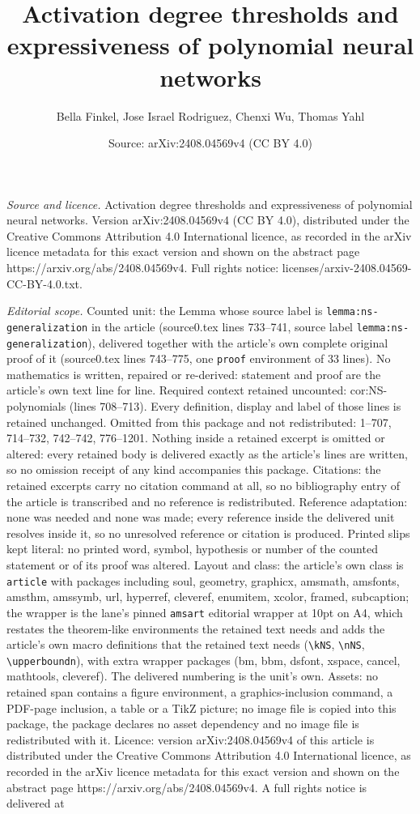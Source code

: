 \documentclass[10pt,a4paper]{amsart}
\title[Activation degree thresholds and expressiveness of polynomia]{Activation degree thresholds and expressiveness of polynomial neural networks}
\author{Bella Finkel, Jose Israel Rodriguez, Chenxi Wu, Thomas Yahl}
\date{Source: arXiv:2408.04569v4 (CC BY 4.0)}
\begin{document}
\maketitle

\noindent\emph{Source and licence.} Activation degree thresholds and expressiveness of polynomial neural networks. Version arXiv:2408.04569v4 (CC BY 4.0), distributed under the Creative Commons Attribution 4.0 International licence, as recorded in the arXiv licence metadata for this exact version and shown on the abstract page https://arxiv.org/abs/2408.04569v4. Full rights notice: licenses/arxiv-2408.04569-CC-BY-4.0.txt.\par\smallskip

\noindent\textit{Editorial scope.} Counted unit: the Lemma whose source label is \texttt{lemma:ns-generalization} in the article (source0.tex lines 733--741, source label \texttt{lemma:ns-generalization}), delivered together with the article's own complete original proof of it (source0.tex lines 743--775, one \texttt{proof} environment of 33 lines). No mathematics is written, repaired or re-derived: statement and proof are the article's own text line for line. Required context retained uncounted: cor:NS-polynomials (lines 708--713). Every definition, display and label of those lines is retained unchanged. Omitted from this package and not redistributed: 1--707, 714--732, 742--742, 776--1201. Nothing inside a retained excerpt is omitted or altered: every retained body is delivered exactly as the article's lines are written, so no omission receipt of any kind accompanies this package. Citations: the retained excerpts carry no citation command at all, so no bibliography entry of the article is transcribed and no reference is redistributed. Reference adaptation: none was needed and none was made; every reference inside the delivered unit resolves inside it, so no unresolved reference or citation is produced. Printed slips kept literal: no printed word, symbol, hypothesis or number of the counted statement or of its proof was altered. Layout and class: the article's own class is \texttt{article} with packages including soul, geometry, graphicx, amsmath, amsfonts, amsthm, amssymb, url, hyperref, cleveref, enumitem, xcolor, framed, subcaption; the wrapper is the lane's pinned \texttt{amsart} editorial wrapper at 10pt on A4, which restates the theorem-like environments the retained text needs and adds the article's own macro definitions that the retained text needs (\texttt{\textbackslash kNS}, \texttt{\textbackslash nNS}, \texttt{\textbackslash upperboundn}), with extra wrapper packages (bm, bbm, dsfont, xspace, cancel, mathtools, cleveref). The delivered numbering is the unit's own. Assets: no retained span contains a figure environment, a graphics-inclusion command, a PDF-page inclusion, a table or a TikZ picture; no image file is copied into this package, the package declares no asset dependency and no image file is redistributed with it. Licence: version arXiv:2408.04569v4 of this article is distributed under the Creative Commons Attribution 4.0 International licence, as recorded in the arXiv licence metadata for this exact version and shown on the abstract page https://arxiv.org/abs/2408.04569v4. A full rights notice is delivered at 
\end{document}
